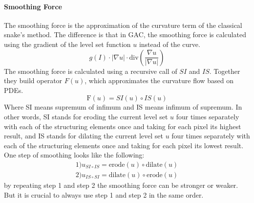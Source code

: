 \paragraph{Smoothing Force}
The smoothing force is the approximation of the curvature term of the classical snake's method. The difference is that in GAC, the smoothing force is calculated using the gradient of the level set function $u$ instead of the curve. 
\begin{equation}
    g(I) \cdot |\nabla u| \cdot \text{div} \left(\frac{\nabla u}{|\nabla u|}\right)
\end{equation}
The smoothing force is calculated using a recursive call of $SI$ and $IS$. Together they build operator $F(u)$, which approximates the curvature flow based on PDEs. 
\begin{equation}
    \text{F}(u) = SI(u)\circ IS (u)
    \label{eq:smoothingforce}
\end{equation}
Where SI means supremum of infimum and IS means infimum of supremum. In other words, SI stands for eroding the current level set $u$ four times separately with each of the structuring elements once and taking for each pixel its highest result, and IS stands for dilating the current level set $u$ four times separately with each of the structuring elements once and taking for each pixel its lowest result. One step of smoothing looks like the following: 
\begin{align*}
    1) u_{SI\circ IS}=\text{erode}(u) \circ \text{dilate}(u) \\
    2) u_{IS\circ SI}=\text{dilate}(u) \circ \text{erode}(u)
\end{align*}
by repeating step 1 and step 2 the smoothing force can be stronger or weaker. But it is crucial to always use step 1 and step 2 in the same order. 


